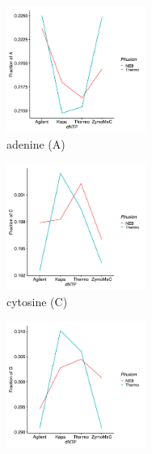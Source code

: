 \documentclass[parskip=full, numbers=noenddot]{scrreprt}
\begin{document}
\begin{figure}[htpb]
  \centering
  \begin{subfigure}[htpb]{0.5\textwidth}
    \centering
    \includegraphics[width=0.5\textwidth]{linearmodel_a}
    \caption{adenine (A)}
    \label{fig:linearmodel_a}
  \end{subfigure}
  \begin{subfigure}[htpb]{0.5\textwidth}
    \centering
    \includegraphics[width=0.5\textwidth]{linearmodel_c}
    \caption{cytosine (C)}
    \label{fig:linearmodel_c}
  \end{subfigure}
  \begin{subfigure}[htpb]{0.5\textwidth}
    \centering
    \includegraphics[width=0.5\textwidth]{linearmodel_g}

\end{subfigure}
\end{figure}
\end{document}
